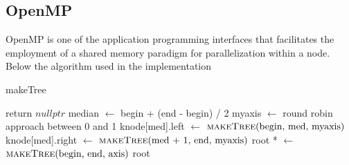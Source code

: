 \documentclass[11pt,a4paper]{article}
\begin{document}
\subsection{OpenMP}
OpenMP is one of the application programming interfaces that facilitates the employment of a shared memory paradigm for parallelization within a node. Below the algorithm used in the implementation
\begin{algorithm}
\caption{makeTree}
\begin{algorithmic}[1]
\State return $\textit{nullptr}$
\EndIf
\State median $\gets$ begin + (end - begin) / 2
\State {}
\State myaxis $\gets$ round robin approach between 0 and 1
\color{blue}
\color{black}
\State knode[med].left $\gets$ $\Call{makeTree}{$begin, med, myaxis$}$
\color{blue}
\color{black}
\State knode[med].right $\gets$ $\Call{makeTree}{$med + 1, end, myaxis$}$
\State \Return {}
\EndFunction
\Statex
{}
\color{blue}
\color{black}
\State root * $\gets$ $\Call{makeTree}{$begin, end, axis$}$
\State \Return root
\EndFunction
\end{algorithmic}
\end{algorithm}
\end{document}
